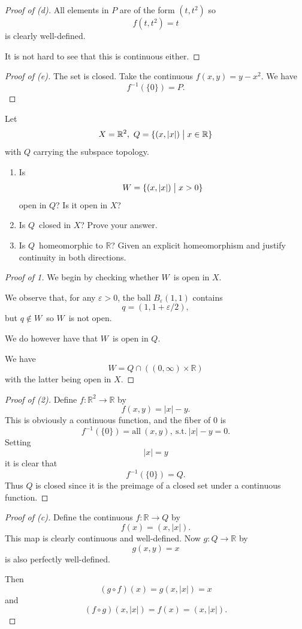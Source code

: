 \documentclass[11pt]{article}
\begin{document}
\begin{proof}[Proof of (d)]
    All elements in $P$ are of the 
    form $(t,t^2)$ so 
    \[
        f(t,t^2) = t 
    \]
    is clearly well-defined. 

    It is not hard to see that this is continuous either. 
\end{proof}
\begin{proof}[Proof of (e)]
    The set is closed. Take the continuous 
    $f(x,y) = y - x^2$. We have 
    \[
        f^{-1}(\{0\}) = P. 
    \] 
\end{proof}

\begin{prob*}
    Let 
    \[
        X = \mathbb R^2, \ Q = \{(x,|x|) \bigm| x \in 
        \mathbb R\}
    \]
    with $Q$ carrying the subspace topology. 

    \begin{enumerate}
        \item Is 
            \[
                W = \{(x,|x|) \bigm| x > 0\}
            \]
            open in $Q$? Is it open in $X$? 
        \item Is $Q$ closed in $X$? Prove your answer. 
        \item Is $Q$ homeomorphic to $\mathbb R$? Given 
            an explicit homeomorphism and justify 
            continuity in both directions.
    \end{enumerate}
\end{prob*}
\begin{proof}[Proof of 1]
    We begin by checking whether $W$ is open in 
    $X$. 
    
    We observe that, for any $\varepsilon > 0$, the ball 
    $B_{\varepsilon}(1,1)$ contains 
    \[
        q = (1, 1 + \varepsilon / 2),  
    \]
    but $q \not \in W$ so $W$ is not open. 

    We do however have that 
    $W$ is open in $Q$. 

    We have 
    \[
        W = Q \cap ((0,\infty) \times \mathbb R)
    \]
    with the latter being open in $X$. 
\end{proof}
\begin{proof}[Proof of (2)]
    Define $f : \mathbb R^2 \to \mathbb R$ by 
    \[
        f(x,y) = |x| - y. 
    \]
    This is obviously a continuous function, and the fiber of 
    $0$ is 
    \[
        f^{-1}(\{0\}) = \text{all} \  
        (x,y), \ \text{s.t.} \ |x| - y = 0. 
    \]
    Setting 
    \[
        |x| = y 
    \]
    it is clear that 
    \[
        f^{-1}(\{0\}) = Q. 
    \]
    Thus $Q$ is closed since it is the preimage of a 
    closed set under a continuous function. 
\end{proof}
\begin{proof}[Proof of (c)]
    Define the continuous $f : \mathbb R \to Q$ by 
    \[
        f(x) = (x,|x|). 
    \]
    This map is clearly continuous and well-defined.  
    Now $g : Q \to \mathbb R$ by 
    \[
        g(x,y) = x 
    \]
    is also perfectly well-defined. 

    Then 
    \[
        (g \circ f)(x) = g(x,|x|) = x 
    \]
    and 
    \[
        (f \circ g)(x,|x|) = f(x) = (x,|x|).
    \]
\end{proof}
\end{document}
